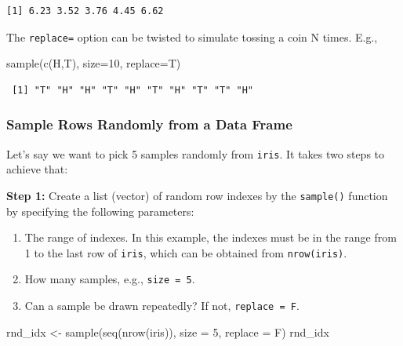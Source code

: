 \documentclass[
  letterpaper,
  DIV=11,
  numbers=noendperiod]{scrreprt}
\newenvironment{Shaded}{\begin{snugshade}}{\end{snugshade}}
\newcommand{\AttributeTok}[1]{\textcolor[rgb]{0.40,0.45,0.13}{#1}}
\newcommand{\DecValTok}[1]{\textcolor[rgb]{0.68,0.00,0.00}{#1}}
\newcommand{\FunctionTok}[1]{\textcolor[rgb]{0.28,0.35,0.67}{#1}}
\newcommand{\NormalTok}[1]{\textcolor[rgb]{0.00,0.23,0.31}{#1}}
\newcommand{\OtherTok}[1]{\textcolor[rgb]{0.00,0.23,0.31}{#1}}
\newcommand{\StringTok}[1]{\textcolor[rgb]{0.13,0.47,0.30}{#1}}
\begin{document}
\begin{verbatim}
[1] 6.23 3.52 3.76 4.45 6.62
\end{verbatim}

The \texttt{replace=} option can be twisted to simulate tossing a coin N
times. E.g.,

\begin{Shaded}
\begin{Highlighting}[]
\FunctionTok{sample}\NormalTok{(}\FunctionTok{c}\NormalTok{(}\StringTok{\textquotesingle{}H\textquotesingle{}}\NormalTok{,}\StringTok{\textquotesingle{}T\textquotesingle{}}\NormalTok{), }\AttributeTok{size=}\DecValTok{10}\NormalTok{, }\AttributeTok{replace=}\NormalTok{T)}
\end{Highlighting}
\end{Shaded}

\begin{verbatim}
 [1] "T" "H" "H" "T" "H" "T" "H" "T" "T" "H"
\end{verbatim}

\subsubsection{Sample Rows Randomly from a Data
Frame}\label{sample-rows-randomly-from-a-data-frame}

Let's say we want to pick 5 samples randomly from \texttt{iris}. It
takes two steps to achieve that:

\textbf{Step 1:} Create a list (vector) of random row indexes by the
\texttt{sample()} function by specifying the following parameters:

\begin{enumerate}
\def\labelenumi{\alph{enumi}.}
\item
  The range of indexes. In this example, the indexes must be in the
  range from 1 to the last row of \texttt{iris}, which can be obtained
  from \texttt{nrow(iris)}.
\item
  How many samples, e.g., \texttt{size\ =\ 5}.
\item
  Can a sample be drawn repeatedly? If not, \texttt{replace\ =\ F}.
\end{enumerate}

\begin{Shaded}
\begin{Highlighting}[]
\NormalTok{rnd\_idx }\OtherTok{\textless{}{-}} \FunctionTok{sample}\NormalTok{(}\FunctionTok{seq}\NormalTok{(}\FunctionTok{nrow}\NormalTok{(iris)), }\AttributeTok{size =} \DecValTok{5}\NormalTok{, }\AttributeTok{replace =}\NormalTok{ F)}
\NormalTok{rnd\_idx}
\end{Highlighting}
\end{Shaded}
\end{document}
